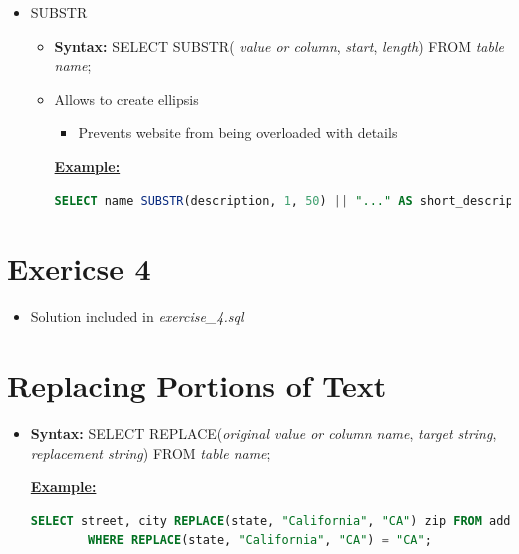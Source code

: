 \documentclass[12pt]{article}
\begin{document}
\begin{itemize}
    \item SUBSTR
    \begin{itemize}
        \item \textbf{Syntax:} SELECT SUBSTR( \textit{value or column}, \textit{start}, \textit{length}) FROM \textit{table name};
        \item Allows to create ellipsis
        \begin{itemize}
            \item Prevents website from being overloaded with details
        \end{itemize}

        \bigskip

        \underline{\textbf{Example:}}

        \bigskip

    \begin{lstlisting}[language=SQL]
    SELECT name SUBSTR(description, 1, 50) || "..." AS short_description, price FROM products;
    \end{lstlisting}

    \end{itemize}
\end{itemize}

\bigskip

\section{Exericse 4}

\bigskip

\begin{itemize}
    \item Solution included in \textit{exercise\_4.sql}
\end{itemize}

\bigskip

\section{Replacing Portions of Text}

\bigskip

\begin{itemize}
    \item \textbf{Syntax:} SELECT REPLACE(\textit{original value or column name}, \textit{target string}, \textit{replacement string}) FROM \textit{table name};

    \bigskip

    \underline{\textbf{Example:}}

    \bigskip

    \begin{lstlisting}[language=SQL]
    SELECT street, city REPLACE(state, "California", "CA") zip FROM addresses
        WHERE REPLACE(state, "California", "CA") = "CA";
    \end{lstlisting}
\end{itemize}
\end{document}
